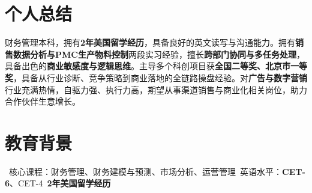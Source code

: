 \documentclass{resume}
\begin{document}



\section{个人总结}
财务管理本科，拥有\textbf{2年美国留学经历}，具备良好的英文读写与沟通能力。拥有\textbf{销售数据分析与PMC生产物料控制}两段实习经验，擅长\textbf{跨部门协同与多任务处理}，具备出色的\textbf{商业敏感度与逻辑思维}。主导多个科创项目获\textbf{全国二等奖、北京市一等奖}，具备从行业诊断、竞争策略到商业落地的全链路操盘经验。对\textbf{广告与数字营销}行业充满热情，自驱力强、执行力高，期望从事渠道销售与商业化相关岗位，助力合作伙伴生意增长。

\section{教育背景}
\ 核心课程：财务管理、财务建模与预测、市场分析、运营管理\textperiodcentered\ 英语水平：\textbf{CET-6}、CET-4\textperiodcentered\ \textbf{2年美国留学经历}
\end{document}
